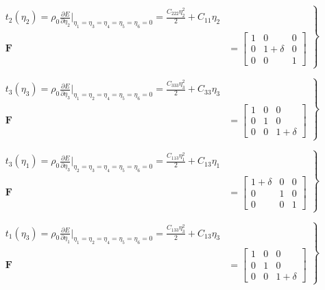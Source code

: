 \documentclass[showpacs,aps,floatfix,prb,reprint,superscriptaddress,onecolumn]{revtex4-1}
\begin{document}
\begin{equation}
\label{eqn:SM-s2}
  \left.\begin{aligned}
        t_{2} \left(\eta_{2}\right) = \rho_{0} \frac{\partial E}{\partial \eta_{2}}\Bigr|_{\eta_1=\eta_3=\eta_4=\eta_5=\eta_6=0} = \frac{C_{222}\eta_{2}^2}{2} + C_{11}\eta_{2}\\
        \bm{F}&=\begin{bmatrix} 1 & 0 & 0 \\ 0 & 1+\delta & 0 \\ 0 & 0 & 1 \end{bmatrix}
       \end{aligned}
			\right\}
\end{equation}


\begin{equation}
\label{eqn:SM-s3}
  \left.\begin{aligned}
        t_{3} \left(\eta_{3}\right) = \rho_{0} \frac{\partial E}{\partial \eta_{3}}\Bigr|_{\eta_1=\eta_2=\eta_4=\eta_5=\eta_6=0} = \frac{C_{333}\eta_{3}^2}{2} + C_{33}\eta_{3}\\
        \bm{F}&=\begin{bmatrix} 1 & 0 & 0 \\ 0 & 1 & 0 \\ 0 & 0 & 1+\delta \end{bmatrix}
       \end{aligned}
			\right\}
\end{equation}


\begin{equation}
\label{eqn:SM-s4}
  \left.\begin{aligned}
        t_{3} \left(\eta_{1}\right) = \rho_{0} \frac{\partial E}{\partial \eta_{3}}\Bigr|_{\eta_2=\eta_3=\eta_4=\eta_5=\eta_6=0} = \frac{C_{113}\eta_{1}^2}{2} + C_{13}\eta_{1}\\
        \bm{F}&=\begin{bmatrix} 1+\delta & 0 & 0 \\ 0 & 1 & 0 \\ 0 & 0 & 1 \end{bmatrix}
       \end{aligned}
			\right\}
\end{equation}


\begin{equation}
\label{eqn:SM-s5}
  \left.\begin{aligned}
        t_{1} \left(\eta_{3}\right) = \rho_{0} \frac{\partial E}{\partial \eta_{1}}\Bigr|_{\eta_1=\eta_2=\eta_4=\eta_5=\eta_6=0} = \frac{C_{133}\eta_{3}^2}{2} + C_{13}\eta_{3}\\
        \bm{F}&=\begin{bmatrix} 1 & 0 & 0 \\ 0 & 1 & 0 \\ 0 & 0 & 1+\delta \end{bmatrix}
       \end{aligned}
			\right\}
\end{equation}
\end{document}
